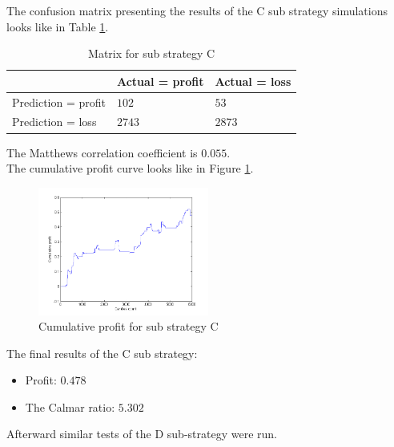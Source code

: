 \documentclass{jtacs}
\begin{document}
The confusion matrix presenting the results of the C sub strategy simulations looks like in Table \ref{tab10}.
\begin{table}[ht]
\centering
\caption{Matrix for sub strategy C}
\label{tab10}
\begin{tabular}{|l|l|l|}\hline
&	Actual = profit	& Actual = loss\\ \hline
Prediction = profit & $102$	& $53$ \\ \hline
Prediction = loss &	$2743$ &	$2873$ \\ \hline
\end{tabular}
\end{table}
\FloatBarrier
\noindent The Matthews correlation coefficient is $0.055$.\\
The cumulative profit curve looks like in Figure \ref{rys10}.
\begin{figure}[ht]
\centering
\includegraphics[width = 0.5\textwidth]{pictures/PivotPointsC.png}
\caption{Cumulative profit for sub strategy C}
\label{rys10}
\end{figure}
\FloatBarrier
The final results of the C sub strategy:
\begin{itemize}
\item Profit: $0.478$
\item The Calmar ratio: $5.302$
\end{itemize}
\vspace{1em}
\noindent Afterward similar tests of the D sub-strategy were run.\\
	
\end{document}
